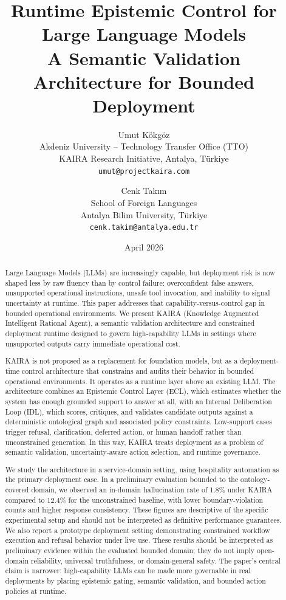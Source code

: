 \documentclass[11pt,a4paper]{article}
\title{Runtime Epistemic Control for Large Language Models\\A Semantic Validation Architecture for Bounded Deployment}
\author{
  Umut K\"{o}kg\"{o}z\\
  Akdeniz University -- Technology Transfer Office (TTO)\\
  KAIRA Research Initiative, Antalya, T\"{u}rkiye\\
  \texttt{umut@projectkaira.com}
  \and
  Cenk Tak{\i}m\\
  School of Foreign Languages\\
  Antalya Bilim University, T\"{u}rkiye\\
  \texttt{cenk.takim@antalya.edu.tr}
}
\date{April 2026}
\begin{document}
\maketitle

\begin{abstract}
Large Language Models (LLMs) are increasingly capable, but deployment risk is now shaped less by raw fluency than by control failure: overconfident false answers, unsupported operational instructions, unsafe tool invocation, and inability to signal uncertainty at runtime. This paper addresses that capability-versus-control gap in bounded operational environments. We present KAIRA (Knowledge Augmented Intelligent Rational Agent), a semantic validation architecture and constrained deployment runtime designed to govern high-capability LLMs in settings where unsupported outputs carry immediate operational cost.

KAIRA is not proposed as a replacement for foundation models, but as a deployment-time control architecture that constrains and audits their behavior in bounded operational environments. It operates as a runtime layer above an existing LLM. The architecture combines an Epistemic Control Layer (ECL), which estimates whether the system has enough grounded support to answer at all, with an Internal Deliberation Loop (IDL), which scores, critiques, and validates candidate outputs against a deterministic ontological graph and associated policy constraints. Low-support cases trigger refusal, clarification, deferred action, or human handoff rather than unconstrained generation. In this way, KAIRA treats deployment as a problem of semantic validation, uncertainty-aware action selection, and runtime governance.

We study the architecture in a service-domain setting, using hospitality automation as the primary deployment case. In a preliminary evaluation bounded to the ontology-covered domain, we observed an in-domain hallucination rate of 1.8\% under KAIRA compared to 12.4\% for the unconstrained baseline, with lower boundary-violation counts and higher response consistency. These figures are descriptive of the specific experimental setup and should not be interpreted as definitive performance guarantees. We also report a prototype deployment setting demonstrating constrained workflow execution and refusal behavior under live use. These results should be interpreted as preliminary evidence within the evaluated bounded domain; they do not imply open-domain reliability, universal truthfulness, or domain-general safety. The paper's central claim is narrower: high-capability LLMs can be made more governable in real deployments by placing epistemic gating, semantic validation, and bounded action policies at runtime.
\end{abstract}
\end{document}
